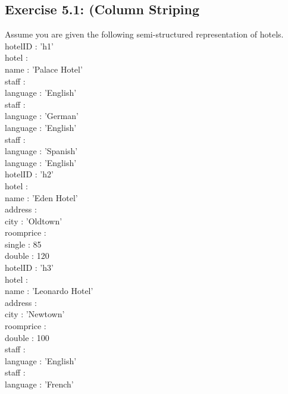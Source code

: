 \documentclass{article}
\begin{document}
\subsection{Exercise 5.1: (Column Striping}
Assume you are given the following semi-structured representation of hotels.\\
hotelID : ’h1’\\
hotel :\\
name : ’Palace Hotel’\\
staff :\\
language : ’English’\\
staff :\\
language : ’German’\\
language : ’English’\\
staff :\\
language : ’Spanish’\\
language : ’English’\\
hotelID : ’h2’\\
hotel :\\
name : ’Eden Hotel’\\
address :\\
city : ’Oldtown’\\
roomprice :\\
single : 85\\
double : 120\\
hotelID : ’h3’\\
hotel :\\
name : ’Leonardo Hotel’\\
address :\\
city : ’Newtown’\\
roomprice :\\
double : 100\\
staff :\\
language : ’English’\\
staff :\\
language : ’French’\\\\
\end{document}
